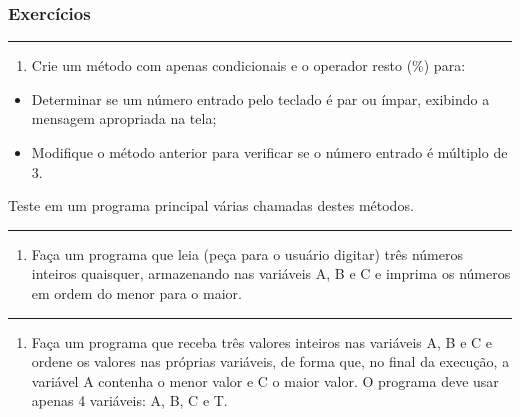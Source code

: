\documentclass[12pt,a4paper]{article}
\renewcommand{\linethickness}{0.05em}
\providecommand{\tightlist}{%
      \setlength{\itemsep}{0pt}\setlength{\parskip}{0pt}}
\begin{document}
    \hypertarget{exercuxedcios}{%
\subsubsection{Exercícios}\label{exercuxedcios}}

    \begin{center}\rule{0.5\linewidth}{\linethickness}\end{center}

\begin{enumerate}
\def\labelenumi{\arabic{enumi}.}
\tightlist
\item
  Crie um método com apenas condicionais e o operador resto (\%) para:
\end{enumerate}

\begin{itemize}
\tightlist
\item
  Determinar se um número entrado pelo teclado é par ou ímpar, exibindo
  a mensagem apropriada na tela;\\
\item
  Modifique o método anterior para verificar se o número entrado é
  múltiplo de 3.
\end{itemize}

Teste em um programa principal várias chamadas destes métodos.

    \begin{center}\rule{0.5\linewidth}{\linethickness}\end{center}

\begin{enumerate}
\def\labelenumi{\arabic{enumi}.}
\setcounter{enumi}{1}
\tightlist
\item
  Faça um programa que leia (peça para o usuário digitar) três números
  inteiros quaisquer, armazenando nas variáveis A, B e C e imprima os
  números em ordem do menor para o maior.
\end{enumerate}

    \begin{center}\rule{0.5\linewidth}{\linethickness}\end{center}

\begin{enumerate}
\def\labelenumi{\arabic{enumi}.}
\setcounter{enumi}{2}
\tightlist
\item
  Faça um programa que receba três valores inteiros nas variáveis A, B e
  C e ordene os valores nas próprias variáveis, de forma que, no final
  da execução, a variável A contenha o menor valor e C o maior valor. O
  programa deve usar apenas 4 variáveis: A, B, C e T.
\end{enumerate}
\end{document}
